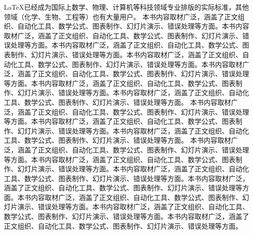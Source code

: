 \documentclass[UTF8]{ctexart}
\begin{document}
\begin{multicols}{2}		
\LaTeX 已经成为国际上数学、物理、计算机等科技领域专业排版的实际标准，其他领域（化学、生物、工程等）也有大量用户。				本书内容取材广泛，涵盖了正文组织、自动化工具、数学公式、图表制作、幻灯片演示、错误处理等方面。本书内容取材广泛，涵盖了正文组织、自动化工具、数学公式、图表制作、幻灯片演示、错误处理等方面。本书内容取材广泛，涵盖了正文组织、自动化工具、数学公式、图表制作、幻灯片演示、错误处理等方面。本书内容取材广泛，涵盖了正文组织、自动化工具、数学公式、图表制作、幻灯片演示、错误处理等方面。本书内容取材广泛，涵盖了正文组织、自动化工具、数学公式、图表制作、幻灯片演示、错误处理等方面。本书内容取材广泛，涵盖了正文组织、自动化工具、数学公式、图表制作、幻灯片演示、错误处理等方面。本书内容取材广泛，涵盖了正文组织、自动化工具、数学公式、图表制作、幻灯片演示、错误处理等方面。				本书内容取材广泛，涵盖了正文组织、自动化工具、数学公式、图表制作、幻灯片演示、错误处理等方面。本书内容取材广泛，涵盖了正文组织、自动化工具、数学公式、图表制作、幻灯片演示、错误处理等方面。本书内容取材广泛，涵盖了正文组织、自动化工具、数学公式、图表制作、幻灯片演示、错误处理等方面。				本书内容取材广泛，涵盖了正文组织、自动化工具、数学公式、图表制作、幻灯片演示、错误处理等方面。本书内容取材广泛，涵盖了正文组织、自动化工具、数学公式、图表制作、幻灯片演示、错误处理等方面。本书内容取材广泛，涵盖了正文组织、自动化工具、数学公式、图表制作、幻灯片演示、错误处理等方面。本书内容取材广泛，涵盖了正文组织、自动化工具、数学公式、图表制作、幻灯片演示、错误处理等方面。本书内容取材广泛，涵盖了正文组织、自动化工具、数学公式、图表制作、幻灯片演示、错误处理等方面。本书内容取材广泛，涵盖了正文组织、自动化工具、数学公式、图表制作、幻灯片演示、错误处理等方面。本书内容取材广泛，涵盖了正文组织、自动化工具、数学公式、图表制作、幻灯片演示、错误处理等方面。	
\end{multicols}
\end{document}
